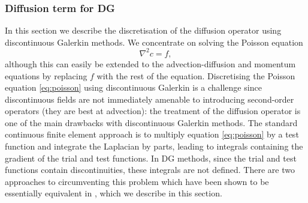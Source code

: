\subsubsection{Diffusion term for DG}
\label{sec:NM_DG_diffusion}
 In this section we describe
the discretisation of the diffusion operator using discontinuous
Galerkin methods. We concentrate on solving the Poisson equation
\begin{equation}
\label{eq:poisson}
\nabla^2 c = f,
\end{equation}
although this can easily be extended to the advection-diffusion and
momentum equations by replacing $f$ with the rest of the equation.
Discretising the Poisson equation \eqref{eq:poisson} using
discontinuous Galerkin is a challenge since discontinuous fields are
not immediately amenable to introducing second-order operators (they
are best at advection): the treatment of the diffusion operator is one
of the main drawbacks with discontinuous Galerkin methods.  The
standard continuous finite element approach is to multiply equation
\eqref{eq:poisson} by a test function and integrate the Laplacian by
parts, leading to integrals containing the gradient of the trial and
test functions. In DG methods, since the trial and test functions contain
discontinuities, these integrals are not defined. There are two
approaches to circumventing this problem which have been shown to be
essentially equivalent in \cite{arnold2002}, which we describe in this
section.

